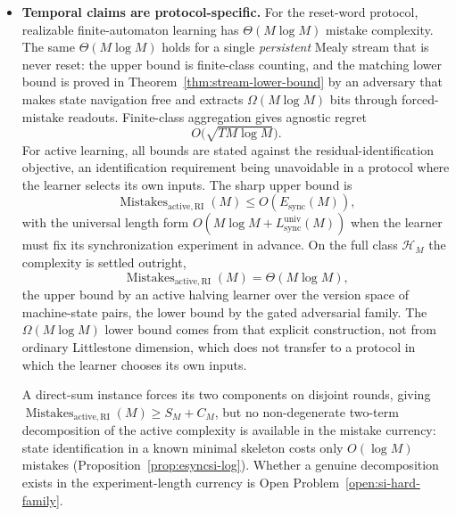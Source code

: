 \documentclass[12pt]{article}
\theoremstyle{definition}
\newcommand{\Lsyncu}{L_{\mathrm{sync}}^{\mathrm{univ}}}
\newcommand{\Esync}{E_{\mathrm{sync}}}
\newcommand{\MistRI}{\operatorname{Mistakes}_{\mathrm{active,RI}}}
\begin{document}
\begin{itemize}[leftmargin=1.8em]
\item \textbf{Temporal claims are protocol-specific.}
For the reset-word protocol, realizable finite-automaton learning has
$\Theta(M\log M)$ mistake complexity.  The same $\Theta(M\log M)$ holds for a
single \emph{persistent} Mealy stream that is never reset: the upper bound is
finite-class counting, and the matching lower bound is proved in
Theorem~\ref{thm:stream-lower-bound} by an adversary that makes state
navigation free and extracts $\Omega(M\log M)$ bits through forced-mistake
readouts.  Finite-class aggregation gives agnostic regret
\[
O\bigl(\sqrt{T M\log M}\bigr).
\]
For active learning, all bounds are stated against the residual-identification
objective, an identification requirement being unavoidable in a protocol where
the learner selects its own inputs.  The sharp upper bound is
\[
\MistRI(M)
\le
O(\Esync(M)),
\]
with the universal length form $O(M\log M+\Lsyncu(M))$ when the learner must
fix its synchronization experiment in advance.  On the full class
$\mathcal H_M$ the complexity is settled outright,
\[
\MistRI(M)
=
\Theta(M\log M),
\]
the upper bound by an active halving learner over the version space of
machine-state pairs, the lower bound by the gated adversarial family.  The
$\Omega(M\log M)$ lower bound comes from that explicit construction,
not from ordinary Littlestone dimension, which does not transfer to a protocol
in which the learner chooses its own inputs.

A direct-sum instance forces its two components on disjoint rounds, giving
$\MistRI(M)\ge S_M+C_M$, but no non-degenerate two-term decomposition of the
active complexity is available in the mistake currency: state identification in
a known minimal skeleton costs only $O(\log M)$ mistakes
(Proposition~\ref{prop:esyncsi-log}).  Whether a genuine decomposition exists
in the experiment-length currency is
Open Problem~\ref{open:si-hard-family}.


\end{itemize}
\end{document}
